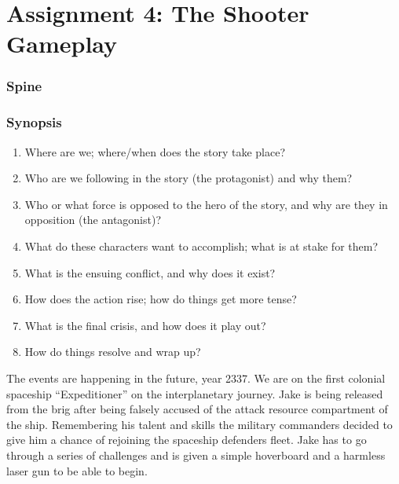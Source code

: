 \documentclass{article}
\begin{document}
\section*{Assignment 4: The Shooter Gameplay}

\subsubsection*{Spine}

\subsubsection*{Synopsis}

\begin{enumerate}

  \item Where are we; where/when does the story take place?

  \item Who are we following in the story (the protagonist) and why them?

  \item Who or what force is opposed to the hero of the story, and why are they
    in opposition (the antagonist)?

  \item What do these characters want to accomplish; what is at stake for them?

  \item What is the ensuing conflict, and why does it exist?

  \item How does the action rise; how do things get more tense?

  \item What is the final crisis, and how does it play out?

  \item How do things resolve and wrap up?

\end{enumerate}

The events are happening in the future, year 2337. We are on the first colonial
spaceship ``Expeditioner'' on the interplanetary journey. Jake is being released
from the brig after being falsely accused of the attack resource compartment of
the ship. Remembering his talent and skills the military commanders decided to
give him a chance of rejoining the spaceship defenders fleet. Jake has to go
through a series of challenges and is given a simple hoverboard and a harmless
laser gun to be able to begin.
\end{document}
